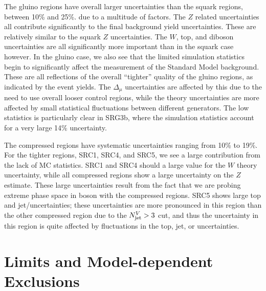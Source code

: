 The gluino regions have overall larger uncertainties than the squark regions, between 10\% and 25\%. due to a multitude of factors.
The $Z$ related uncertainties all contribute significantly to the final background yield uncertainties.
These are relatively similar to the squark $Z$ uncertainties.
The $W$, top, and diboson uncertainties are all significantly more important than in the squark case however.
In the gluino case, we also see that the limited simulation statistics begin to significantly affect the measurement of the Standard Model background.
These are all reflections of the overall ``tighter'' quality of the gluino regions, as indicated by the event yields.
The $\Delta_{\mu}$ uncertainties are affected by this due to the need to use overall looser control regions, while the theory uncertainties are more affected by small statistical fluctuations between different generators.
The low statistics is particularly clear in SRG3b, where the simulation statistics account for a very large 14\% uncertainty.

The compressed regions have systematic uncertainties ranging from 10\% to 19\%.
For the tighter regions, SRC1, SRC4, and SRC5, we see a large contribution from the lack of MC statistics.
SRC1 and SRC4 should a large value for the $W$ theory uncertainty, while all compressed regions show a large uncertainty on the $Z$ estimate.
These large uncertainties result from the fact that we are probing extreme phase space in boson \pt with the compressed regions.
SRC5 shows large top and jet/\met uncertainties; these uncertainties are more pronounced in this region than the other compressed region due to the $N_{\text{jet}}^V > 3$ cut, and thus the uncertainty in this region is quite affected by fluctuations in the top, jet, or \met uncertainties.




\section{Limits and Model-dependent Exclusions}

